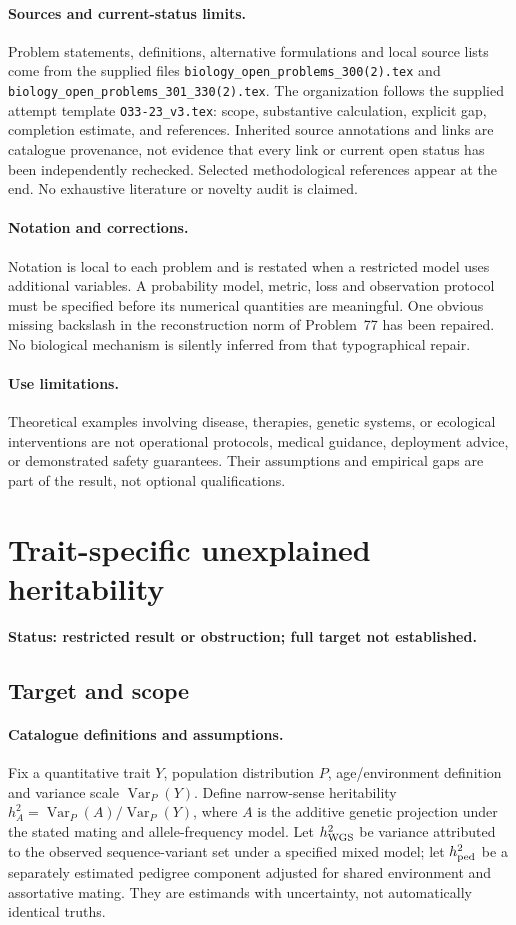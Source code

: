 \documentclass[11pt]{article}
\begin{document}
\paragraph{Sources and current-status limits.}
Problem statements, definitions, alternative formulations and local source lists
come from the supplied files
\texttt{biology\_open\_problems\_300(2).tex} and
\texttt{biology\_open\_problems\_301\_330(2).tex}.
The organization follows the supplied attempt template
\texttt{O33-23\_v3.tex}: scope, substantive calculation, explicit gap,
completion estimate, and references. Inherited source annotations and links are
catalogue provenance, not evidence that every link or current open status has
been independently rechecked. Selected methodological references appear at the
end. No exhaustive literature or novelty audit is claimed.

\paragraph{Notation and corrections.}
Notation is local to each problem and is restated when a restricted model uses
additional variables. A probability model, metric, loss and observation protocol
must be specified before its numerical quantities are meaningful. One obvious
missing backslash in the reconstruction norm of Problem~77 has been repaired.
No biological mechanism is silently inferred from that typographical repair.

\paragraph{Use limitations.}
Theoretical examples involving disease, therapies, genetic systems, or ecological
interventions are not operational protocols, medical guidance, deployment advice,
or demonstrated safety guarantees. Their assumptions and empirical gaps are part
of the result, not optional qualifications.


\section*{Trait-specific unexplained heritability}
\label{prob:023}
\noindent\textbf{Status: restricted result or obstruction; full target not established.}
\subsection{Target and scope}
\paragraph{Catalogue definitions and assumptions.}
Fix a quantitative trait $Y$, population distribution $P$, age/environment definition and variance scale $\operatorname{Var}_P(Y)$. Define narrow-sense heritability $h_A^2=\operatorname{Var}_P(A)/\operatorname{Var}_P(Y)$, where $A$ is the additive genetic projection under the stated mating and allele-frequency model. Let $h_{\rm WGS}^2$ be variance attributed to the observed sequence-variant set under a specified mixed model; let $h_{\rm ped}^2$ be a separately estimated pedigree component adjusted for shared environment and assortative mating. They are estimands with uncertainty, not automatically identical truths.
\end{document}

